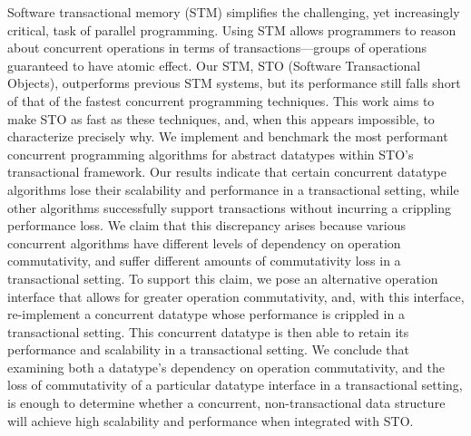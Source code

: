 Software transactional memory (STM) simplifies the challenging, yet increasingly critical, task of parallel programming. Using STM allows programmers to reason about concurrent operations in terms of transactions---groups of operations guaranteed to have atomic effect. Our STM, STO (Software Transactional Objects), outperforms previous STM systems, but its performance still falls short of that of the fastest concurrent programming techniques. This work aims to make STO as fast as these techniques, and, when this appears impossible, to characterize precisely why. 
We implement and benchmark the most performant concurrent programming algorithms for abstract datatypes within STO's transactional framework. Our results indicate that certain concurrent datatype algorithms lose their scalability and performance in a transactional setting, while other algorithms successfully support transactions without incurring a crippling performance loss. We claim that this discrepancy arises because various concurrent algorithms have different levels of dependency on operation commutativity, and suffer different amounts of commutativity loss in a transactional setting. To support this claim, we pose an alternative operation interface that allows for greater operation commutativity, and, with this interface, re-implement a concurrent datatype whose performance is crippled in a transactional setting. This concurrent datatype is then able to retain its performance and scalability in a transactional setting.
We conclude that examining both a datatype's dependency on operation commutativity, and the loss of commutativity of a particular datatype interface in a transactional setting, is enough to determine whether a concurrent, non-transactional data structure will achieve high scalability and performance when integrated with STO.
